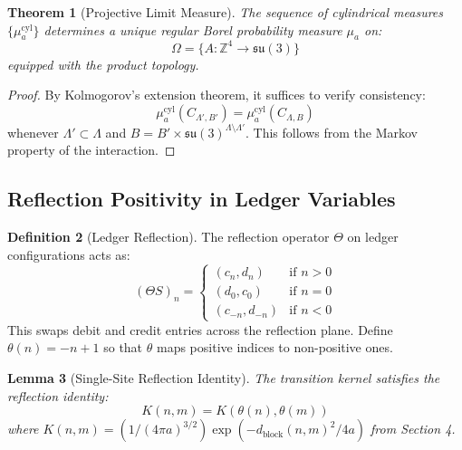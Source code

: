 \documentclass[11pt]{article}
\numberwithin{equation}{section}
\newtheorem{theorem}{Theorem}[section]
\newtheorem{lemma}[theorem]{Lemma}
\theoremstyle{definition}
\newtheorem{definition}[theorem]{Definition}
\theoremstyle{remark}
\begin{document}
\begin{theorem}[Projective Limit Measure]
The sequence of cylindrical measures $\{\mu_a^{\text{cyl}}\}$ determines a unique regular Borel probability measure $\mu_a$ on:
\begin{equation}
\Omega = \{A : \mathbb{Z}^4 \to \mathfrak{su}(3)\}
\end{equation}
equipped with the product topology.
\end{theorem}

\begin{proof}
By Kolmogorov's extension theorem, it suffices to verify consistency:
\begin{equation}
\mu_a^{\text{cyl}}(C_{\Lambda',B'}) = \mu_a^{\text{cyl}}(C_{\Lambda,B})
\end{equation}
whenever $\Lambda' \subset \Lambda$ and $B = B' \times \mathfrak{su}(3)^{\Lambda \setminus \Lambda'}$. This follows from the Markov property of the interaction.
\end{proof}

\subsection{Reflection Positivity in Ledger Variables}

\begin{definition}[Ledger Reflection]
The reflection operator $\Theta$ on ledger configurations acts as:
\begin{equation}
(\Theta S)_n = \begin{cases}
(c_n, d_n) & \text{if } n > 0 \\
(d_0, c_0) & \text{if } n = 0 \\
(c_{-n}, d_{-n}) & \text{if } n < 0
\end{cases}
\end{equation}
This swaps debit and credit entries across the reflection plane. Define $\theta(n) = -n + 1$ so that $\theta$ maps positive indices to non-positive ones.
\end{definition}

\begin{lemma}[Single-Site Reflection Identity]
The transition kernel satisfies the reflection identity:
\begin{equation}
K(n,m) = K(\theta(n), \theta(m))
\end{equation}
where $K(n,m) = (1/(4\pi a)^{3/2}) \exp(-d_{\text{block}}(n,m)^2/4a)$ from Section 4.
\end{lemma}
\end{document}
